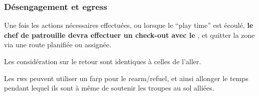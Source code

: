 \subsubsection{Désengagement et egress}

\begin{e1}
	\item
	Une fois les actions nécessaires effectuées, ou lorsque le ``play time'' est écoulé, \textbf{le chef de patrouille devra effectuer un check-out avec le \ja{}}, et quitter la zone via une route planifiée ou assignée.
	\item Les considération sur le retour sont identiques à celles de l'aller.
	\item Les \gls{rw}s peuvent utiliser un \gls{farp} pour le rearm/refuel, et ainsi allonger le temps pendant lequel ils sont à même de soutenir les troupes au sol alliées.

	\item {}

\end{e1}

